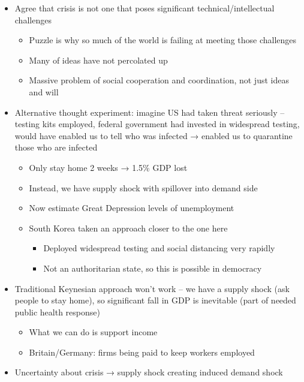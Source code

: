 \begin{itemize}
\tightlist
\item
  Agree that crisis is not one that poses significant
  technical/intellectual challenges

  \begin{itemize}
  \tightlist
  \item
    Puzzle is why so much of the world is failing at meeting those
    challenges
  \item
    Many of ideas have not percolated up
  \item
    Massive problem of social cooperation and coordination, not just
    ideas and will
  \end{itemize}
\item
  Alternative thought experiment: imagine US had taken threat seriously
  -- testing kits employed, federal government had invested in
  widespread testing, would have enabled us to tell who was infected →
  enabled us to quarantine those who are infected

  \begin{itemize}
  \tightlist
  \item
    Only stay home 2 weeks → 1.5\% GDP lost
  \item
    Instead, we have supply shock with spillover into demand side
  \item
    Now estimate Great Depression levels of unemployment
  \item
    South Korea taken an approach closer to the one here

    \begin{itemize}
    \tightlist
    \item
      Deployed widespread testing and social distancing very rapidly
    \item
      Not an authoritarian state, so this is possible in democracy
    \end{itemize}
  \end{itemize}
\item
  Traditional Keynesian approach won't work -- we have a supply shock
  (ask people to stay home), so significant fall in GDP is inevitable
  (part of needed public health response)

  \begin{itemize}
  \tightlist
  \item
    What we can do is support income
  \item
    Britain/Germany: firms being paid to keep workers employed
  \end{itemize}
\item
  Uncertainty about crisis → supply shock creating induced demand shock


\end{itemize}
